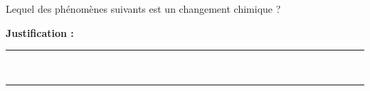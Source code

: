 Lequel des phénomènes suivants est un changement chimique ?

\choices

\noindent\textbf{Justification :} \hrulefill \\[2.5ex]
\rule{\linewidth}{0.4pt} \\[2.5ex]
\rule{\linewidth}{0.4pt}
\vfill

